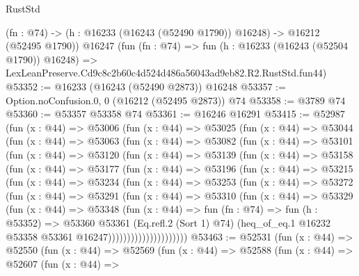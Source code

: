 \begin{lexlean}{RustStd}
\begin{coremodule}
    (fn : @74) -> (h : @16233 (@16243 (@52490 @1790)) @16248) -> @16212 (@52495 @1790))
    @16247
    (fun (fn : @74) =>
    fun (h : @16233 (@16243 (@52504 @1790)) @16248) =>
    LexLeanPreserve.Cd9c8c2b60c4d524d486a56043ad9eb82.R2.RustStd.fun44)
@53352 := @16233 (@16243 (@52490 @2873)) @16248
@53357 := Option.noConfusion.{0, 0} (@16212 (@52495 @2873)) @74
@53358 := @3789 @74
@53360 := @53357 @53358 @74
@53361 := @16246 @16291
@53415 := @52987
    (fun (x : @44) =>
    @53006
      (fun (x : @44) =>
      @53025
        (fun (x : @44) =>
        @53044
          (fun (x : @44) =>
          @53063
            (fun (x : @44) =>
            @53082
              (fun (x : @44) =>
              @53101
                (fun (x : @44) =>
                @53120
                  (fun (x : @44) =>
                  @53139
                    (fun (x : @44) =>
                    @53158
                      (fun (x : @44) =>
                      @53177
                        (fun (x : @44) =>
                        @53196
                          (fun (x : @44) =>
                          @53215
                            (fun (x : @44) =>
                            @53234
                              (fun (x : @44) =>
                              @53253
                                (fun (x : @44) =>
                                @53272
                                  (fun (x : @44) =>
                                  @53291
                                    (fun (x : @44) =>
                                    @53310
                                      (fun (x : @44) =>
                                      @53329
                                        (fun (x : @44) =>
                                        @53348
                                          (fun (x : @44) =>
                                          fun (fn : @74) =>
                                          fun (h : @53352) =>
                                          @53360
                                            @53361
                                            (Eq.refl.{2} (Sort 1) @74)
                                            (heq_of_eq.{1}
                                              @16232
                                              @53358
                                              @53361
                                              @16247)))))))))))))))))))))
@53463 := @52531
    (fun (x : @44) =>
    @52550
      (fun (x : @44) =>
      @52569
        (fun (x : @44) =>
        @52588
          (fun (x : @44) =>
          @52607
            (fun (x : @44) =>

\end{coremodule}
\end{lexlean}
